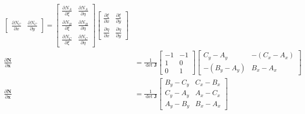 \documentclass[10pt]{article}
\begin{document}
\begin{itemize}
\begin{align}
\begin{bmatrix}
                \frac{\partial N_C}{\partial x} & \frac{\partial N_C}{\partial y}
            \end{bmatrix}
            =
            \begin{bmatrix}
                \frac{\partial N_A}{\partial \xi} & \frac{\partial N_A}{\partial \eta} \\
                \frac{\partial N_B}{\partial \xi} & \frac{\partial N_B}{\partial \eta} \\
                \frac{\partial N_C}{\partial \xi} & \frac{\partial N_C}{\partial \eta}
            \end{bmatrix}
            \begin{bmatrix}
                \frac{\partial \xi}{\partial x} & \frac{\partial \xi}{\partial y} \\
                \frac{\partial \eta}{\partial x} & \frac{\partial \eta}{\partial y}
            \end{bmatrix} \\
            \frac{\partial \mathbf{N}}{\partial \mathbf{x}}
            &=
            \frac{1}{\det \mathbf{J}}
            \begin{bmatrix}
                -1 & -1 \\
                1 & 0 \\
                0 & 1
            \end{bmatrix}
            \begin{bmatrix}
                C_y - A_y & -(C_x - A_x) \\
                -(B_y - A_y) & B_x - A_x
            \end{bmatrix} \\
            \frac{\partial \mathbf{N}}{\partial \mathbf{x}}
            &=
            \frac{1}{\det \mathbf{J}}
            \begin{bmatrix}
                B_y - C_y & C_x - B_x \\
                C_y - A_y & A_x - C_x \\
                A_y - B_y & B_x - A_x
            \end{bmatrix}
        \end{align}
\end{itemize}
\end{document}
